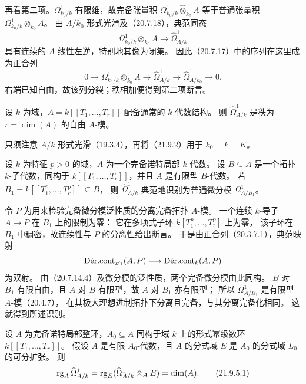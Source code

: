 再看第二项。$\Omega^1_{k_0/k}$ 有限维，故完备张量积
$\Omega^1_{k_0/k}\widehat\otimes_{k_0}A$
等于普通张量积 $\Omega^1_{k_0/k}\otimes_{k_0}A$。
由 $A/k_0$ 形式光滑及（20.7.18），典范同态
\[
 \Omega^1_{k_0/k}\otimes_{k_0}A\longrightarrow\widehat\Omega^1_{A/k}
\]
具有连续的 $A$-线性左逆，特别地其像为闭集。
因此（20.7.17）中的序列在这里成为正合列
\[
 0\longrightarrow\Omega^1_{k_0/k}\otimes_{k_0}A
 \longrightarrow\widehat\Omega^1_{A/k}
 \longrightarrow\widehat\Omega^1_{A/k_0}\longrightarrow0.
\]
右端已知自由，故该列分裂；秩相加便得到第二项断言。
\finishproof

设 $k$ 为域，$A=k[[T_1,\ldots,T_r]]$ 配备通常的 $k$-代数结构。
则 $\widehat\Omega^1_{A/k}$ 是秩为 $r=\dim(A)$ 的自由 $A$-模。

只须注意 $A/k$ 形式光滑（19.3.4），再将（21.9.2）用于 $k_0=k=K$。

设 $k$ 为特征 $p>0$ 的域，$A$ 为一个完备诺特局部 $k$-代数。
设 $B\subseteq A$ 是一个拓扑 $k$-子代数，同构于
$k[[T_1,\ldots,T_r]]$，并且 $A$ 是有限型 $B$-代数。
若 $B_1=k[[T_1^p,\ldots,T_r^p]]\subseteq B$，
则 $\widehat\Omega^1_{A/k}$ 典范地识别为普通微分模 $\Omega^1_{A/B_1}$。

\eproof
令 $P$ 为用来检验完备微分模泛性质的分离完备拓扑 $A$-模。
一个连续 $k$-导子 $A\to P$ 在 $B_1$ 上的限制为零：
它在多项式子环 $k[T_1^p,\ldots,T_r^p]$ 上为零，
该子环在 $B_1$ 中稠密，故连续性与 $P$ 的分离性给出断言。
于是由正合列（20.3.7.1），典范映射
\[
 \DerCont_{B_1}(A,P)\longrightarrow\DerCont_k(A,P)
\]
为双射。
由（20.7.14.4）及微分模的泛性质，两个完备微分模由此同构。
$B$ 对 $B_1$ 有限自由，且 $A$ 对 $B$ 有限型，故 $A$ 对 $B_1$ 亦有限型；
所以 $\Omega^1_{A/B_1}$ 是有限型 $A$-模（20.4.7），
在其极大理想进制拓扑下分离且完备，与其分离完备化相同。
这就得到所述识别。
\finishproof

设 $A$ 为完备诺特局部整环，$A_0\subseteq A$ 同构于域 $k$ 上的形式幂级数环
$k[[T_1,\ldots,T_r]]$。
假设 $A$ 是有限 $A_0$-代数，且 $A$ 的分式域 $E$ 是 $A_0$ 的分式域 $L_0$ 的可分扩张。
则
\begin{equation}
 \rk_A\widehat\Omega^1_{A/k}
 =\rk_E(\widehat\Omega^1_{A/k}\otimes_AE)=\dim(A).
 \tag{21.9.5.1}
\end{equation}


